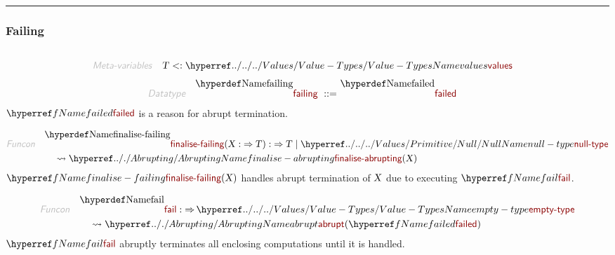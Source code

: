 

\begin{center}
\rule{3in}{0.4pt}
\end{center}

\subsubsection{Failing}\hypertarget{failing}{}\label{failing}

\begin{align*}
  [ \
  \KEY{Datatype} \quad & \NAMEREF{failing} \\
  \KEY{Funcon} \quad & \NAMEREF{failed} \\
  \KEY{Funcon} \quad & \NAMEREF{finalise-failing} \\
  \KEY{Funcon} \quad & \NAMEREF{fail} \\
  \KEY{Funcon} \quad & \NAMEREF{else} \\
  \KEY{Funcon} \quad & \NAMEREF{else-choice} \\
  \KEY{Funcon} \quad & \NAMEREF{checked} \\
  \KEY{Funcon} \quad & \NAMEREF{check-true}
  \ ]
\end{align*}
\begin{align*}
  \KEY{Meta-variables} \quad
  & \VAR{T} <: \NAMEHYPER{../../../Values}{Value-Types}{values}
\end{align*}
\begin{align*}
  \KEY{Datatype} \quad 
  \NAMEDECL{failing} 
  \ ::= \ & \NAMEDECL{failed}
\end{align*}
$\SHADE{\NAMEREF{failed}}$ is a reason for abrupt termination.

\begin{align*}
  \KEY{Funcon} \quad
  & \NAMEDECL{finalise-failing}(
                       \VAR{X} :  \TO \VAR{T}) 
    :  \TO \VAR{T}  \mid \NAMEHYPER{../../../Values/Primitive}{Null}{null-type} \\&\quad
    \leadsto \NAMEHYPER{../.}{Abrupting}{finalise-abrupting}
               (  \VAR{X} )
\end{align*}
$\SHADE{\NAMEREF{finalise-failing}
           (  \VAR{X} )}$ handles abrupt termination of $\SHADE{\VAR{X}}$ due to executing $\SHADE{\NAMEREF{fail}}$.

\begin{align*}
  \KEY{Funcon} \quad
  & \NAMEDECL{fail} 
    :  \TO \NAMEHYPER{../../../Values}{Value-Types}{empty-type} \\&\quad
    \leadsto \NAMEHYPER{../.}{Abrupting}{abrupt}
               (  \NAMEREF{failed} )
\end{align*}
$\SHADE{\NAMEREF{fail}}$ abruptly terminates all enclosing computations until it is handled.

